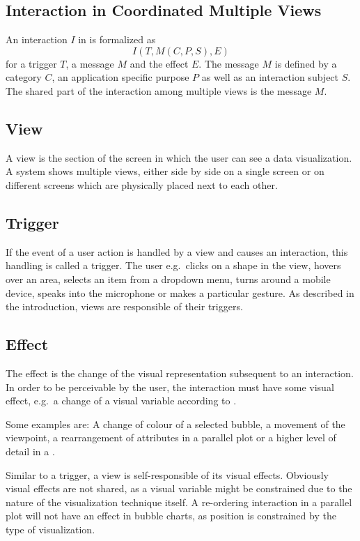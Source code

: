 \subsection{Interaction in Coordinated Multiple Views}\label{sec:concept:framework:interaction}
An interaction $I$ in \cmvs{} is formalized as
\begin{equation}
  I(T, M(C,P,S), E)
\end{equation}
for a trigger $T$, a message $M$ and the effect $E$.
The message $M$ is defined by a category $C$, an application specific purpose $P$ as well as an interaction subject $S$.
The shared part of the interaction among multiple views is the message $M$.

\subsection{View}
A view is the section of the screen in which the user can see a data visualization.
A \cmv{} system shows multiple views, either side by side on a single screen or on different screens which are physically placed next to each other.


\subsection{Trigger}
If the event of a user action is handled by a view and causes an interaction, this handling is called a trigger.
The user e.g.\ clicks on a shape in the view, hovers over an area, selects an item from a dropdown menu, turns around a mobile device, speaks into the microphone or makes a particular gesture.
As described in the introduction, views are responsible of their triggers.


\subsection{Effect}
The effect is the change of the visual representation subsequent to an interaction.
In order to be perceivable by the user, the interaction must have some visual effect, e.g.\ a change of a visual variable according to \textcite{Bertin2010}.

Some examples are:
A change of colour of a selected bubble, a movement of the viewpoint, a rearrangement of attributes in a parallel plot or a higher level of detail in a \tmap{}.

Similar to a trigger, a view is self-responsible of its visual effects.
Obviously visual effects are not shared, as a visual variable might be constrained due to the nature of the visualization technique itself.
A re-ordering interaction in a parallel plot will not have an effect in bubble charts, as position is constrained by the type of visualization.

